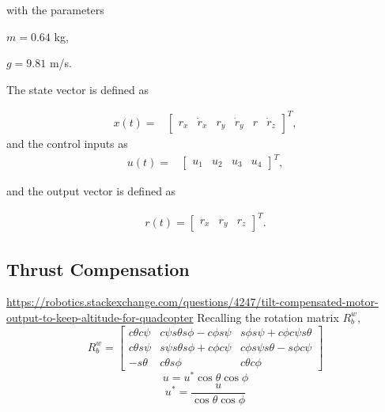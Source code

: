 with the parameters  

$m=0.64 $ kg, 

$g=9.81$ m/s.


The state vector is defined as

\begin{align*}
x(t)=&
\begin{bmatrix}
r_x & \dot{r}_x & r_y & \dot{r}_y & r &\dot{r}_z 
\end{bmatrix}^T,
\end{align*}
and the control inputs as
\begin{align*}
u(t)=&
\begin{bmatrix}
u_1 & u_2 &u_3 & u_4
\end{bmatrix}^T,
\end{align*}

and the output vector is defined as

\begin{align*}
r(t)=
\begin{bmatrix}
r_{x} & r_{y} & r_{z}
\end{bmatrix}^T.
\end{align*}

\subsection{Thrust Compensation}
\url{https://robotics.stackexchange.com/questions/4247/tilt-compensated-motor-output-to-keep-altitude-for-quadcopter}
Recalling the rotation matrix $R_{b}^{w}$,
\begin{equation}
R_{b}^{w} = \begin{bmatrix}
c\theta c\psi & c\psi s\theta s\phi-c\phi s\psi & s\phi s\psi+c\phi c\psi s\theta\\
c\theta s\psi & s\psi s\theta s\phi+c\phi c\psi & c\phi s\psi s\theta - s\phi c\psi\\
-s\theta & c\theta s\phi & c\theta c\phi
\end{bmatrix}
\end{equation}
\begin{equation}
u = u^{*} \cos{\theta}\cos{\phi}
\end{equation}
\begin{equation}
u^{*} = \dfrac{u}{\cos{\theta}\cos{\phi}}
\end{equation}
